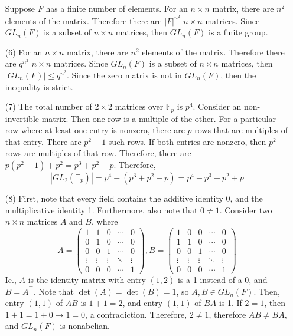 \documentclass[12pt]{article}
\begin{document}
\begin{itemize}
Suppose $F$ has a finite number of elements. For an $n \times n$ matrix, there are $n^2$ elements of the matrix. Therefore there are $|F|^{n^2}$ $n \times n$ matrices. Since $GL_n(F)$ is a subset of $n \times n$ matrices, then $GL_n(F)$ is a finite group.
\item[(6)]
For an $n \times n$ matrix, there are $n^2$ elements of the matrix. Therefore there are $q^{n^2}$ $n \times n$ matrices. Since $GL_n(F)$ is a subset of $n \times n$ matrices, then $|GL_n(F)| \leq q^{n^2}$. Since the zero matrix is not in $GL_n(F)$, then the inequality is strict.
\item[(7)]
The total number of $2 \times 2$ matrices over $\mathbb{F}_p$ is $p^4$. Consider an non-invertible matrix. Then one row is a multiple of the other. For a particular row where at least one entry is nonzero, there are $p$ rows that are multiples of that entry. There are $p^2 - 1$ such rows. If both entries are nonzero, then $p^2$ rows are multiples of that row. Therefore, there are $p(p^2 - 1) + p^2 = p^3 + p^2 - p$. Therefore,
$$|GL_2(\mathbb{F}_p)| = p^4 - (p^3 + p^2 - p) = p^4 - p^3 - p^2 + p$$
\item[(8)]
First, note that every field contains the additive identity 0, and the multiplicative identity 1. Furthermore, also note that $0 \neq 1$. Consider two $n \times n$ matrices $A$ and $B$, where
$$A = \begin{pmatrix}
1 & 1 & 0 & \cdots & 0 \\
0 & 1 & 0 & \cdots & 0 \\
0 & 0 & 1 & \cdots & 0 \\
\vdots & \vdots & \vdots & \ddots & \vdots \\
0 & 0 & 0 & \cdots & 1
\end{pmatrix}, B = \begin{pmatrix}
1 & 0 & 0 & \cdots & 0 \\
1 & 1 & 0 & \cdots & 0 \\
0 & 0 & 1 & \cdots & 0 \\
\vdots & \vdots & \vdots & \ddots & \vdots \\
0 & 0 & 0 & \cdots & 1
\end{pmatrix}$$
Ie., $A$ is the identity matrix with entry $(1, 2)$ is a 1 instead of a 0, and $B = A^\top$. Note that $\det(A) = \det(B) = 1$, so $A, B \in GL_n(F)$. Then, entry $(1,1)$ of $AB$ is $1 + 1 = 2$, and entry $(1,1)$ of $BA$ is 1. If $2 = 1$, then $1 + 1 = 1 + 0 \rightarrow 1 = 0$, a contradiction. Therefore, $2 \neq 1$, therefore $AB \neq BA$, and $GL_n(F)$ is nonabelian.

\end{itemize}
\end{document}
